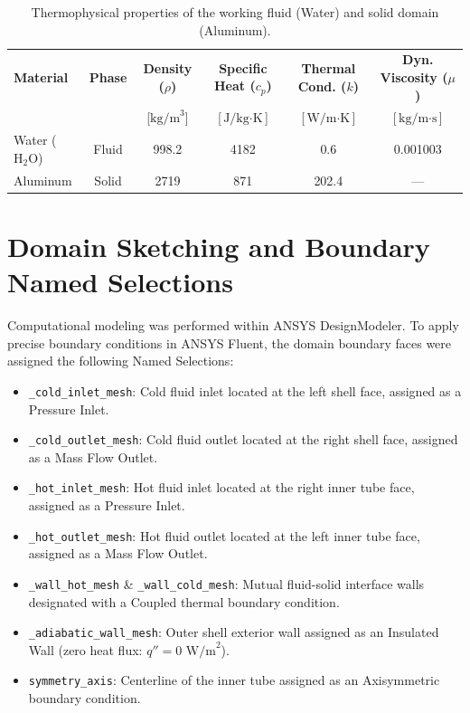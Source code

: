 \documentclass[12pt,a4paper]{report}
\begin{document}
\begin{table}[H]
\centering
\small
\caption{Thermophysical properties of the working fluid (Water) and solid domain (Aluminum).}
\label{tab:thermophysical_props}
\begin{tabular}{lccccc}
\toprule
\textbf{Material} & \textbf{Phase} & \textbf{Density ($\rho$)} & \textbf{Specific Heat ($c_p$)} & \textbf{Thermal Cond. ($k$)} & \textbf{Dyn. Viscosity ($\mu$)} \\
& & [$\text{kg/m}^3$] & [$\text{J/kg}\cdot\text{K}$] & [$\text{W/m}\cdot\text{K}$] & [$\text{kg/m}\cdot\text{s}$] \\
\midrule
Water ($\text{H}_2\text{O}$) & Fluid & 998.2 & 4182 & 0.6 & 0.001003 \\
Aluminum & Solid & 2719 & 871 & 202.4 & --- \\
\bottomrule
\end{tabular}
\end{table}

\section{Domain Sketching and Boundary Named Selections}
Computational modeling was performed within ANSYS DesignModeler. To apply precise boundary conditions in ANSYS Fluent, the domain boundary faces were assigned the following Named Selections:
\begin{itemize}
    \item \texttt{\_cold\_inlet\_mesh}: Cold fluid inlet located at the left shell face, assigned as a Pressure Inlet.
    \item \texttt{\_cold\_outlet\_mesh}: Cold fluid outlet located at the right shell face, assigned as a Mass Flow Outlet.
    \item \texttt{\_hot\_inlet\_mesh}: Hot fluid inlet located at the right inner tube face, assigned as a Pressure Inlet.
    \item \texttt{\_hot\_outlet\_mesh}: Hot fluid outlet located at the left inner tube face, assigned as a Mass Flow Outlet.
    \item \texttt{\_wall\_hot\_mesh} \& \texttt{\_wall\_cold\_mesh}: Mutual fluid-solid interface walls designated with a Coupled thermal boundary condition.
    \item \texttt{\_adiabatic\_wall\_mesh}: Outer shell exterior wall assigned as an Insulated Wall (zero heat flux: $q'' = 0\text{ W/m}^2$).
    \item \texttt{symmetry\_axis}: Centerline of the inner tube assigned as an Axisymmetric boundary condition.
\end{itemize}
\end{document}

